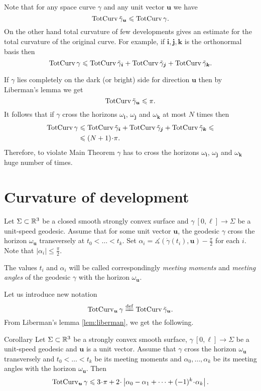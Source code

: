 \documentclass[a4paper,10pt]{article}
\begin{document}
Note that for any space curve $\gamma$ and any unit vector $\bm{u}$
we have 
\[\mathop{\rm TotCurv}\nolimits\tilde\gamma_{\bm{u}}\leqslant\mathop{\rm TotCurv}\nolimits\gamma.\]
On the other hand total curvature of few developments gives an estimate 
for the total curvature of the original curve.
For example, if $\bm{i},\bm{j},\bm{k}$ is the orthonormal basis then
\[\mathop{\rm TotCurv}\nolimits\gamma
\leqslant
\mathop{\rm TotCurv}\nolimits\tilde\gamma_{\bm{i}}+\mathop{\rm TotCurv}\nolimits\tilde\gamma_{\bm{j}}+\mathop{\rm TotCurv}\nolimits\tilde\gamma_{\bm{k}}.\]

If $\gamma$ lies completely on the dark (or bright) side for direction $\bm{u}$
then by Liberman's lemma we get 
\[\mathop{\rm TotCurv}\nolimits\tilde\gamma_{\bm{u}}\leqslant \pi.\]
It follows that if $\gamma$ cross the horizons $\omega_{\bm{i}}$, $\omega_{\bm{j}}$ and $\omega_{\bm{k}}$
at most $N$ times then 
\begin{align*}
\tc\gamma
&\le
\tc\tilde\gamma_{\bm{i}}
+\tc\tilde\gamma_{\bm{j}}
+\tc\tilde\gamma_{\bm{k}}
\le
\\
&\le(N+1)\cdot \pi.
\end{align*}
Therefore, 
to violate Main Theorem 
$\gamma$ has to cross the  horizons $\omega_{\bm{i}}$, $\omega_{\bm{j}}$ and $\omega_{\bm{k}}$ huge number of times.

\section{Curvature of development}\label{sec:curv-develop}

Let $\Sigma\subset\mathbb{R}^3$
be a closed smooth strongly convex surface
and $\gamma\:[0,\ell]\to \Sigma$ be a unit-speed geodesic.
Assume that for some unit vector $\bm{u}$,
the geodesic $\gamma$ cross the horizon $\omega_{\bm{u}}$ transversely at 
$t_0<\dots <t_k$.
Set $\alpha_i=\measuredangle(\dot\gamma(t_i),\bm{u})-\tfrac\pi2$ for each $i$.
Note that $|\alpha_i|\le\tfrac\pi2$.

The values $t_i$ and  $\alpha_i$ 
will be called correspondingly \emph{meeting moments} 
and \emph{meeting angles}
of the geodesic $\gamma$ with the horizon $\omega_{\bm{u}}$.

Let us introduce new notation
\[\tc_{\bm{u}}\gamma\df\tc\tilde\gamma_{\bm{u}}.\]
From Liberman's lemma \ref{lem:liberman},
we get the following.

\begin{thm}{Corollary}\label{cor:liberman}
Let $\Sigma\subset\mathbb{R}^3$
be a strongly convex smooth surface,
$\gamma\:[0,\ell]\to \Sigma$ be a unit-speed geodesic
and $\bm{u}$ is a unit vector.
Assume that  $\gamma$ cross the horizon $\omega_{\bm{u}}$ transversely
and 
$t_0<\dots <t_k$ be its meeting moments 
and $\alpha_0,\dots,\alpha_k$ be its meeting angles with the horizon $\omega_{\bm{u}}$.
Then
\[\tc_{\bm{u}}\gamma
\le 3\cdot\pi
+
2\cdot\left|\alpha_0-\alpha_1
+\dots +(-1)^k\cdot\alpha_k\right|.
\]

\end{thm}
\end{document}
